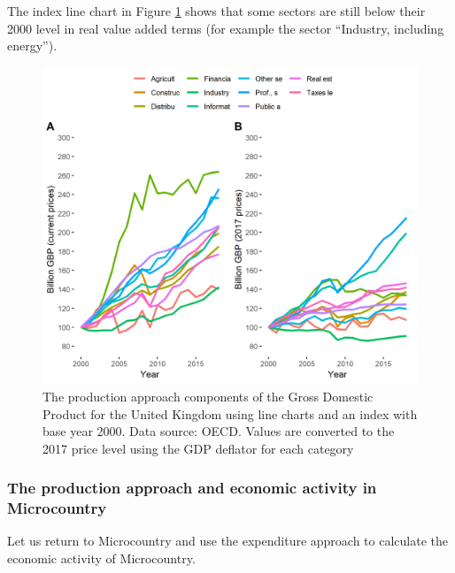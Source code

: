 \documentclass[]{book}
\begin{document}
The index line chart in Figure \ref{fig:gdp11} shows that some sectors are still below their 2000 level in real value added terms (for example the sector ``Industry, including energy'').

\begin{figure}

{\centering \includegraphics[width=0.9\linewidth]{_resources/chapter_gdp/fig9} 

}

\caption{The production approach components of the Gross Domestic Product for the United Kingdom using line charts and an index with base year 2000. Data source: OECD. Values are converted to the 2017 price level using the GDP deflator for each category}\label{fig:gdp11}
\end{figure}

\hypertarget{the-production-approach-and-economic-activity-in-microcountry}{%
\subsubsection{The production approach and economic activity in Microcountry}\label{the-production-approach-and-economic-activity-in-microcountry}}

Let us return to Microcountry and use the expenditure approach to calculate the economic activity of Microcountry.
\end{document}
